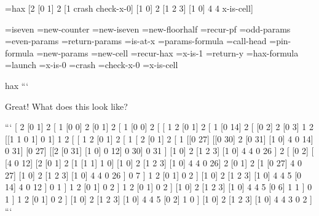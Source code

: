 \documentclass[twoside]{article}
\begin{document}
=hax [2 [0 1] 2 [1 crash check-x-0] [1 0] 2 [1 2 3] [1 0] 4 4 x-is-cell]

=iseven
=new-counter
=new-iseven
=new-floorhalf
=recur-pf
=odd-params
=even-params
=return-params
=is-at-x
=params-formula
=call-head
=pin-formula
=new-params
=new-cell
=recur-hax
=x-is-1
=return-y
=hax-formula
=launch
=x-is-0
=crash
=check-x-0
=x-is-cell

hax
```

Great! What does this look like?

```
[ 2
  [0 1]
  2
  [ 1
    [0 0]
    2
    [0 1]
    2
    [ 1
      [0 0]
      2
      [ [ 1
          2
          [0 1]
          2
          [ 1
            [0 14]
            2
            [ [0 2]
              2
              [0 3]
              1
              2
              [[1 1 0 1] 0 1]
              1
              2
              [ [ 1
                  2
                  [0 1]
                  2
                  [ 1
                    [ 2
                      [0 1]
                      2
                      [ 1
                        [[0 27] [[0 30] 2 [0 31] [1 0] 4 0 14] 0 31]
                        [0 27]
                        [[2 [0 31] [1 0] 0 12] 0 30]
                        0
                        31
                      ]
                      [1 0]
                      2
                      [1 2 3]
                      [1 0]
                      4
                      4
                      0
                      26
                    ]
                    2
                    [ [0 2]
                      [ [4 0 12]
                        [2 [0 1] 2 [1 [1 1] 1 0] [1 0] 2 [1 2 3] [1 0] 4 4 0 26]
                        2
                        [0 1]
                        2
                        [1 [0 27] 4 0 27]
                        [1 0]
                        2
                        [1 2 3]
                        [1 0]
                        4
                        4
                        0
                        26
                      ]
                      0
                      7
                    ]
                    1
                    2
                    [0 1]
                    0
                    2
                  ]
                  [1 0]
                  2
                  [1 2 3]
                  [1 0]
                  4
                  4
                  5
                  [0 14]
                  4
                  0
                  12
                ]
                0
                1
              ]
              1
              2
              [0 1]
              0
              2
            ]
            1
            2
            [0 1]
            0
            2
          ]
          [1 0]
          2
          [1 2 3]
          [1 0]
          4
          4
          5
          [0 6]
          1
          1
        ]
        0
        1
      ]
      1
      2
      [0 1]
      0
      2
    ]
    [1 0]
    2
    [1 2 3]
    [1 0]
    4
    4
    5
    [0 2]
    1
    0
  ]
  [1 0]
  2
  [1 2 3]
  [1 0]
  4
  4
  3
  0
  2
]
```
\end{document}
